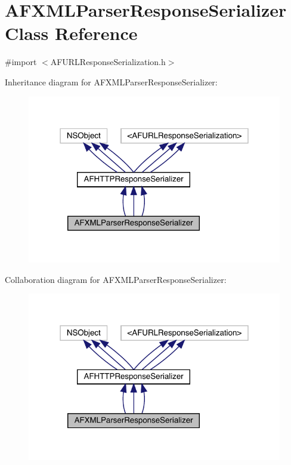 \hypertarget{interface_a_f_x_m_l_parser_response_serializer}{}\section{A\+F\+X\+M\+L\+Parser\+Response\+Serializer Class Reference}
\label{interface_a_f_x_m_l_parser_response_serializer}


{\ttfamily \#import $<$A\+F\+U\+R\+L\+Response\+Serialization.\+h$>$}



Inheritance diagram for A\+F\+X\+M\+L\+Parser\+Response\+Serializer\+:\nopagebreak
\begin{figure}[H]
\begin{center}
\leavevmode
\includegraphics[width=316pt]{interface_a_f_x_m_l_parser_response_serializer__inherit__graph}
\end{center}
\end{figure}


Collaboration diagram for A\+F\+X\+M\+L\+Parser\+Response\+Serializer\+:\nopagebreak
\begin{figure}[H]
\begin{center}
\leavevmode
\includegraphics[width=316pt]{interface_a_f_x_m_l_parser_response_serializer__coll__graph}
\end{center}
\end{figure}

